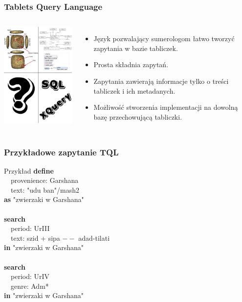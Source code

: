 \begin{frame}
     \frametitle{Tablets Query Language}
 \begin{columns}
   \includegraphics[width=55mm]{../diagramy/poco.pdf}      
  \begin{itemize}
    \item Język pozwalający sumerologom łatwo tworzyć zapytania w bazie tabliczek.\\
    \item  Prosta składnia zapytań.\\
    \item    Zapytania zawierają informacje tylko o treści tabliczek i ich metadanych.\\
    \item   Możliwość stworzenia implementacji na dowolną bazę przechowującą tabliczki.\\ %
  \end{itemize}
 \end{columns}
\end{frame}

\begin{frame}
 \frametitle{Przykładowe zapytanie TQL}
\begin{block}{Przykład}
\textbf{define}\\
~~provenience: Garshana\\
~~text: "udu ban"/mash2\\
\textbf{as} "zwierzaki w Garshana"\\
~\\
\textbf{search}\\
~~period: UrIII\\
~~text: szid + sipa $--$ adad-tilati\\
\textbf{in} "zwierzaki w Garshana"\\
~\\
\textbf{search}\\
~~period: UrIV\\
~~genre: Adm*\\
\textbf{in} "zwierzaki w Garshana"\\
\end{block}
\end{frame}
